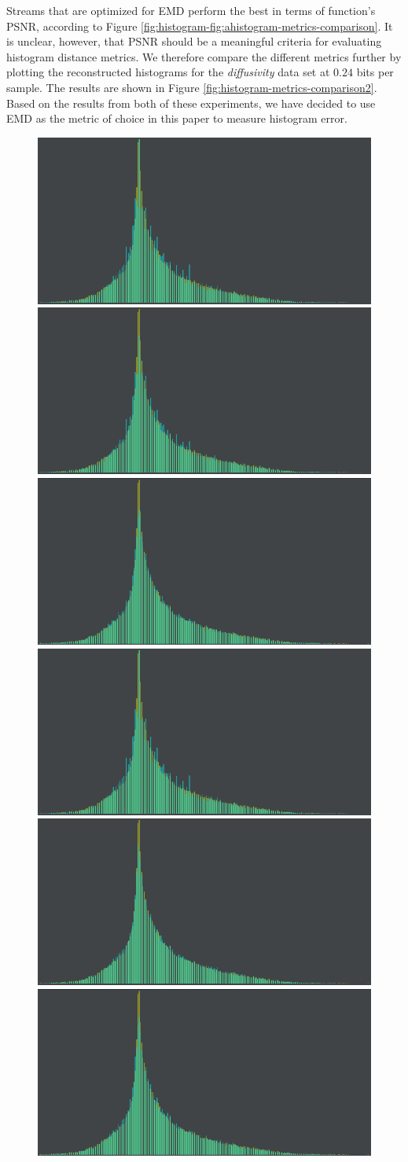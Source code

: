 Streams that are optimized for EMD perform the best in terms of function's PSNR, according to Figure
\ref{fig:histogram-fig:ahistogram-metrics-comparison}. It is unclear, however, that PSNR should be a
meaningful criteria for evaluating histogram distance metrics. We therefore compare the different
metrics further by plotting the reconstructed histograms for the \emph{diffusivity} data set at
$0.24$ bits per sample. The results are shown in Figure \ref{fig:histogram-metrics-comparison2}.
Based on the results from both of these experiments, we have decided to use EMD as the metric of
choice in this paper to measure histogram error. 

\begin{figure}
	\centering
	{\includegraphics[width=0.24\linewidth]{img/histogram/different-metrics/bhattacharyya.png}}
	{\includegraphics[width=0.24\linewidth]{img/histogram/different-metrics/chi_square.png}}
	{\includegraphics[width=0.24\linewidth]{img/histogram/different-metrics/emd.png}}
	{\includegraphics[width=0.24\linewidth]{img/histogram/different-metrics/hellinger.png}}
	{\includegraphics[width=0.24\linewidth]{img/histogram/different-metrics/total_variation.png}}
	{\includegraphics[width=0.24\linewidth]{img/histogram/different-metrics/intersection.png}}

\end{figure}

